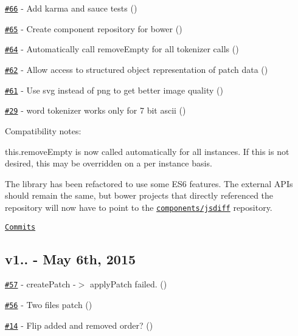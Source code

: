 \begin{DoxyItemize}
\item \href{https://github.com/kpdecker/jsdiff/issues/66}{\tt \#66} -\/ Add karma and sauce tests (\href{https://api.github.com/users/kpdecker}{\tt })
\item \href{https://github.com/kpdecker/jsdiff/issues/65}{\tt \#65} -\/ Create component repository for bower (\href{https://api.github.com/users/kpdecker}{\tt })
\item \href{https://github.com/kpdecker/jsdiff/issues/64}{\tt \#64} -\/ Automatically call remove\+Empty for all tokenizer calls (\href{https://api.github.com/users/kpdecker}{\tt })
\item \href{https://github.com/kpdecker/jsdiff/pull/62}{\tt \#62} -\/ Allow access to structured object representation of patch data (\href{https://api.github.com/users/bittrance}{\tt })
\item \href{https://github.com/kpdecker/jsdiff/pull/61}{\tt \#61} -\/ Use svg instead of png to get better image quality (\href{https://api.github.com/users/PeterDaveHello}{\tt })
\item \href{https://github.com/kpdecker/jsdiff/issues/29}{\tt \#29} -\/ word tokenizer works only for 7 bit ascii (\href{https://api.github.com/users/plasmagunman}{\tt })
\end{DoxyItemize}

Compatibility notes\+:
\begin{DoxyItemize}
\item {\ttfamily this.\+remove\+Empty} is now called automatically for all instances. If this is not desired, this may be overridden on a per instance basis.
\item The library has been refactored to use some E\+S6 features. The external A\+P\+Is should remain the same, but bower projects that directly referenced the repository will now have to point to the \href{https://github.com/components/jsdiff}{\tt components/jsdiff} repository.
\end{DoxyItemize}

\href{https://github.com/kpdecker/jsdiff/compare/v1.4.0...v2.0.0}{\tt Commits}

\subsection*{v1.. -\/ May 6th, 2015}


\begin{DoxyItemize}
\item \href{https://github.com/kpdecker/jsdiff/issues/57}{\tt \#57} -\/ create\+Patch -\/$>$ apply\+Patch failed. (\href{https://api.github.com/users/mog422}{\tt })
\item \href{https://github.com/kpdecker/jsdiff/pull/56}{\tt \#56} -\/ Two files patch (\href{https://api.github.com/users/rgeissert}{\tt })
\item \href{https://github.com/kpdecker/jsdiff/issues/14}{\tt \#14} -\/ Flip added and removed order? (\href{https://api.github.com/users/jakesandlund}{\tt })
\end{DoxyItemize}

